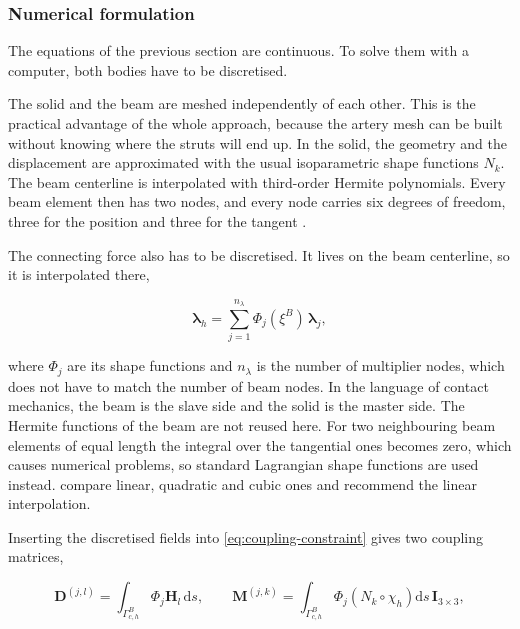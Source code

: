 \subsubsection{Numerical formulation}
\label{sec:numerical-formulation}

The equations of the previous section are continuous. To solve them with a computer, both bodies have to be discretised.

The solid and the beam are meshed independently of each other. This is the practical advantage of the whole approach, because the artery mesh can be built without knowing where the struts will end up. In the solid, the geometry and the displacement are approximated with the usual isoparametric shape functions $N_k$. The beam centerline is interpolated with third-order Hermite polynomials. Every beam element then has two nodes, and every node carries six degrees of freedom, three for the position and three for the tangent \citep{steinbrecher2020}.

The connecting force also has to be discretised. It lives on the beam centerline, so it is interpolated there,

\begin{equation}
  \boldsymbol{\lambda}_h = \sum_{j=1}^{n_\lambda} \Phi_j(\xi^B)\, \boldsymbol{\lambda}_j , \label{eq:lambda-interp}
\end{equation}

where $\Phi_j$ are its shape functions and $n_\lambda$ is the number of multiplier nodes, which does not have to match the number of beam nodes. In the language of contact mechanics, the beam is the slave side and the solid is the master side. The Hermite functions of the beam are not reused here. For two neighbouring beam elements of equal length the integral over the tangential ones becomes zero, which causes numerical problems, so standard Lagrangian shape functions are used instead. \citet{steinbrecher2020} compare linear, quadratic and cubic ones and recommend the linear interpolation.

Inserting the discretised fields into \cref{eq:coupling-constraint} gives two coupling matrices,

\begin{equation}
  \boldsymbol{D}^{(j,l)} = \int_{\Gamma^B_{c,h}} \Phi_j \boldsymbol{H}_l \, \mathrm{d}s , \qquad \boldsymbol{M}^{(j,k)} = \int_{\Gamma^B_{c,h}} \Phi_j \left( N_k \circ \chi_h \right) \mathrm{d}s \, \boldsymbol{I}_{3\times3} , \label{eq:mortar-matrices}
\end{equation}

